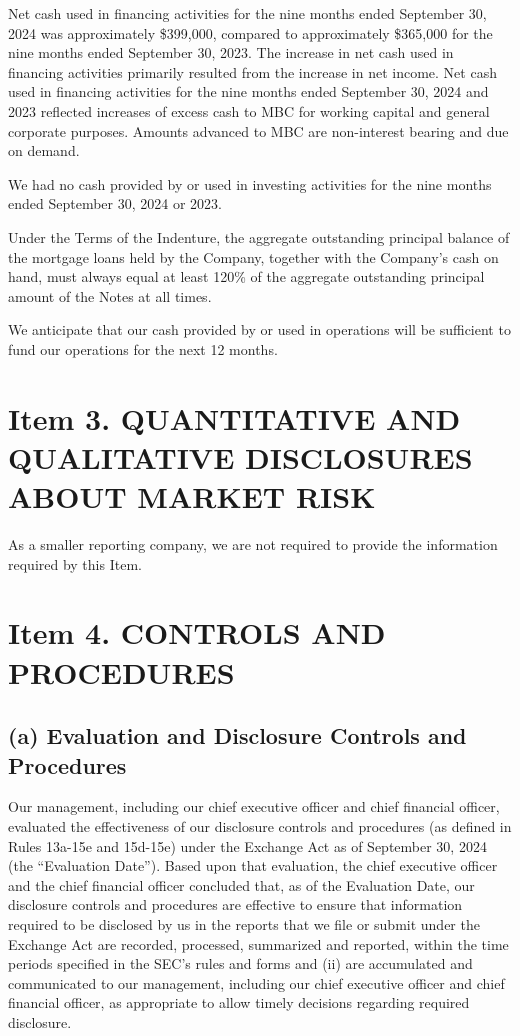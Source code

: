 \documentclass{article}
\begin{document}
Net cash used in financing activities for the nine months ended September 30, 2024 was approximately \$399,000, compared to approximately \$365,000 for the nine months ended September 30, 2023. The increase in net cash used in financing activities primarily resulted from the increase in net income. Net cash used in financing activities for the nine months ended September 30, 2024 and 2023 reflected increases of excess cash to MBC for working capital and general corporate purposes. Amounts advanced to MBC are non-interest bearing and due on demand.

We had no cash provided by or used in investing activities for the nine months ended September 30, 2024 or 2023.

Under the Terms of the Indenture, the aggregate outstanding principal balance of the mortgage loans held by the Company, together with the Company's cash on hand, must always equal at least 120\% of the aggregate outstanding principal amount of the Notes at all times.

We anticipate that our cash provided by or used in operations will be sufficient to fund our operations for the next 12 months.


\section*{Item 3. QUANTITATIVE AND QUALITATIVE DISCLOSURES ABOUT MARKET RISK}
As a smaller reporting company, we are not required to provide the information required by this Item.

\section*{Item 4. CONTROLS AND PROCEDURES}

\subsection*{(a) Evaluation and Disclosure Controls and Procedures}
Our management, including our chief executive officer and chief financial officer, evaluated the effectiveness of our disclosure controls and procedures (as defined in Rules 13a-15e and 15d-15e) under the Exchange Act as of September 30, 2024 (the “Evaluation Date”). Based upon that evaluation, the chief executive officer and the chief financial officer concluded that, as of the Evaluation Date, our disclosure controls and procedures are effective to ensure that information required to be disclosed by us in the reports that we file or submit under the Exchange Act are recorded, processed, summarized and reported, within the time periods specified in the SEC’s rules and forms and (ii) are accumulated and communicated to our management, including our chief executive officer and chief financial officer, as appropriate to allow timely decisions regarding required disclosure.
\end{document}
